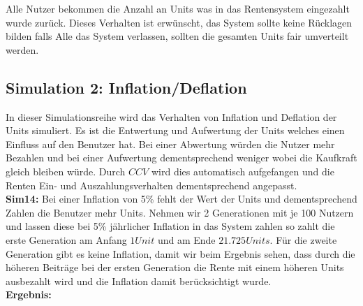 \begin{table}[hbt!]
\centering
{}
\end{table}

Alle Nutzer bekommen die Anzahl an Units was in das Rentensystem eingezahlt wurde zurück. Dieses Verhalten ist erwünscht, das System sollte keine Rücklagen bilden falls Alle das System verlassen, sollten die gesamten Units fair umverteilt werden.

\subsection{Simulation 2: Inflation/Deflation}

In dieser Simulationsreihe wird das Verhalten von Inflation und Deflation der Units simuliert. Es ist die Entwertung und Aufwertung der Units welches einen Einfluss auf den Benutzer hat. Bei einer Abwertung würden die Nutzer mehr Bezahlen und bei einer Aufwertung dementsprechend weniger wobei die Kaufkraft gleich bleiben würde. Durch $CCV$ wird dies automatisch aufgefangen und die Renten Ein- und Auszahlungsverhalten dementsprechend angepasst. \\

\textbf{Sim14:} Bei einer Inflation von 5\% fehlt der Wert der Units und dementsprechend Zahlen die Benutzer mehr Units. Nehmen wir 2 Generationen mit je 100 Nutzern und lassen diese bei 5\% jährlicher Inflation in das System zahlen so zahlt die erste Generation am Anfang $1 Unit$  und am Ende $21.725 Units$. Für die zweite Generation gibt es keine Inflation, damit wir beim Ergebnis sehen, dass durch die höheren Beiträge bei der ersten Generation die Rente mit einem höheren Units ausbezahlt wird und die Inflation damit berücksichtigt wurde. \\

\textbf{Ergebnis:}

